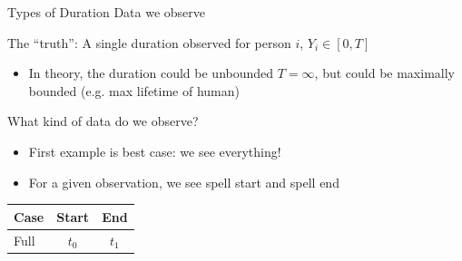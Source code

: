 \documentclass[notes,11pt, aspectratio=169]{beamer}
\newenvironment{wideitemize}{\itemize\addtolength{\itemsep}{10pt}}{\enditemize}
\begin{document}
\begin{frame}{Types of Duration Data we observe}
  \begin{wideitemize}
  \item The ``truth'': A single duration observed for person $i$, $Y_{i} \in [0, T]$
    \begin{itemize}
    \item In theory, the duration could be unbounded $T = \infty$, but
      could be maximally bounded (e.g. max lifetime of human)
    \end{itemize}
  \item What kind of data do we observe?
    \begin{itemize}
    \item First example is best case: we see everything!
    \item For a given observation, we see spell start and spell end
    \end{itemize}
  \end{wideitemize}
  \begin{center}
    \begin{tabular}{lcc}
      Case & Start & End\\
      \midrule
      Full & $t_{0}$ & $t_{1}$\\
    \end{tabular}
\end{center}
\end{frame}
\end{document}
